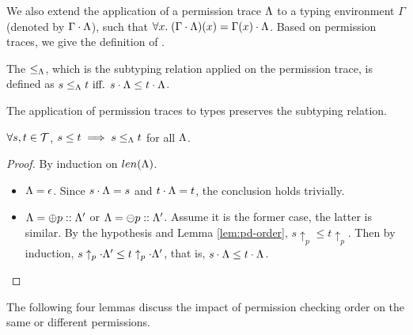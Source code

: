 {{{We also extend the application of a permission trace $\Lambda$ to a typing environment $\Gamma$ (denoted by $\Gamma\cdot\Lambda$), such that $\forall x.\; (\Gamma\cdot{\ensuremath{\Lambda}})(x) = \Gamma(x)\cdot \Lambda$.
Based on permission traces, we give the definition of .
\begin{definition}\label{def:partial-subtype}
The  $\leq_{\Lambda} $, which is the subtyping relation applied on the permission trace, is defined as $s\leq_{\Lambda}  t \text{ iff. } s\cdot \Lambda \leq t\cdot \Lambda$.
\end{definition}

The application of permission traces to types preserves the subtyping relation. 
\begin{lemma}\label{lem:monotrace}
$\forall s, t \in \mathcal{T}$, $s\leq t \implies s\leq_{\Lambda} t$ for all $\Lambda$.
\end{lemma}
\begin{proof}
By induction on $len(\Lambda)$.\\
\begin{itemize}
\item $\Lambda=\epsilon$.
Since $s\cdot\Lambda=s$ and $t\cdot\Lambda=t$, the conclusion holds trivially.
\item
$\Lambda=\oplus p :: \Lambda'$ or $\Lambda=\ominus p :: \Lambda'$. Assume it is the former case, the latter is similar.
By the hypothesis and Lemma \ref{lem:pd-order}, $s\uparrow_{p}\leq t\uparrow_{p}$.
Then by induction, $s\uparrow_{p}\cdot\Lambda'\leq t\uparrow_{p}\cdot\Lambda'$,
that is, $s\cdot\Lambda\leq t\cdot\Lambda$.
\end{itemize}
\end{proof}


The following four lemmas discuss the impact of permission checking order on the same or different permissions.

}}}
